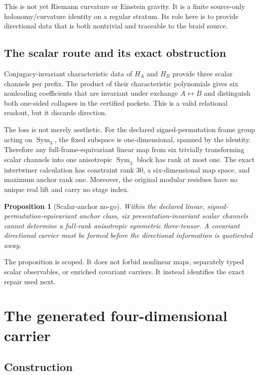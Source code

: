 \documentclass[11pt]{article}
\newtheorem{proposition}[theorem]{Proposition}
\theoremstyle{definition}
\theoremstyle{remark}
\newcommand{\Sym}{\operatorname{Sym}}
\begin{document}
This is not yet Riemann curvature or Einstein gravity. It is a finite source-only holonomy/curvature identity on a regular stratum. Its role here is to provide directional data that is both nontrivial and traceable to the braid source.

\subsection{The scalar route and its exact obstruction}

Conjugacy-invariant characteristic data of $H_A$ and $H_B$ provide three scalar channels per prefix. The product of their characteristic polynomials gives six nonleading coefficients that are invariant under exchange $A\leftrightarrow B$ and distinguish both one-sided collapses in the certified packets. This is a valid relational readout, but it discards direction.

The loss is not merely aesthetic. For the declared signed-permutation frame group acting on $\Sym_3$, the fixed subspace is one-dimensional, spanned by the identity. Therefore any full-frame-equivariant linear map from six trivially transforming scalar channels into one anisotropic $\Sym_3$ block has rank at most one. The exact intertwiner calculation has constraint rank 30, a six-dimensional map space, and maximum anchor rank one. Moreover, the original modular residues have no unique real lift and carry no stage index.

\begin{proposition}[Scalar-anchor no-go]\label{prop:nogo}
Within the declared linear, signed-permutation-equivariant anchor class, six presentation-invariant scalar channels cannot determine a full-rank anisotropic symmetric three-tensor. A covariant directional carrier must be formed before the directional information is quotiented away.
\end{proposition}

The proposition is scoped. It does not forbid nonlinear maps, separately typed scalar observables, or enriched covariant carriers. It instead identifies the exact repair used next.

\section{The generated four-dimensional carrier}

\subsection{Construction}
\end{document}
